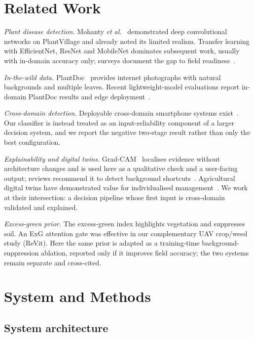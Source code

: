 \documentclass[journal,twocolumn,10pt]{IEEEtran}
\begin{document}
\section{Related Work}

\emph{Plant disease detection.} Mohanty \emph{et al.}~\cite{mohanty2016} demonstrated deep
convolutional networks on PlantVillage and already noted its limited realism. Transfer learning
with EfficientNet, ResNet and MobileNet dominates subsequent work, usually with in-domain
accuracy only; surveys document the gap to field readiness~\cite{survey2025,review2025}.

\emph{In-the-wild data.} PlantDoc~\cite{plantdoc} provides internet photographs with natural
backgrounds and multiple leaves. Recent lightweight-model evaluations report in-domain PlantDoc
results and edge deployment~\cite{edge2026}.

\emph{Cross-domain detection.} Deployable cross-domain smartphone systems exist~\cite{crossdomain2025}.
Our classifier is instead treated as an input-reliability component of a larger decision system,
and we report the negative two-stage result rather than only the best configuration.

\emph{Explainability and digital twins.} Grad-CAM~\cite{gradcam} localises evidence without
architecture changes and is used here as a qualitative check and a user-facing output; reviews
recommend it to detect background shortcuts~\cite{review2025}. Agricultural digital twins have
demonstrated value for individualised management~\cite{kim2024}. We work at their intersection:
a decision pipeline whose first input is cross-domain validated and explained.

\emph{Excess-green prior.} The excess-green index highlights vegetation and suppresses soil. An
ExG attention gate was effective in our complementary UAV crop/weed study (ReVit). Here the same
prior is adapted as a training-time background-suppression ablation, reported only if it improves
field accuracy; the two systems remain separate and cross-cited.

\section{System and Methods}
\label{sec:methods}

\subsection{System architecture}
\end{document}
